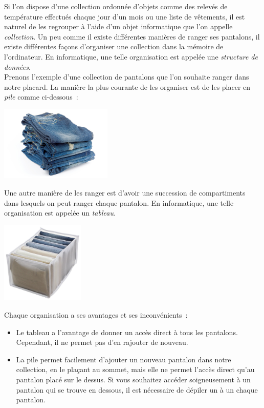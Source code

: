 \documentclass{magnolia}
\begin{document}

\magtoc

\bigskip

Si l'on dispose d'une collection ordonnée d'objets comme des relevés de température effectués
chaque jour d'un mois ou une liste de vêtements, il est naturel de les regrouper à l'aide d'un objet
informatique que l'on appelle \emph{collection}. Un peu comme il existe différentes manières de
ranger ses pantalons, il existe différentes façons d'organiser une collection dans
la mémoire de l'ordinateur. En informatique, une telle organisation est appelée une
\emph{structure de données}.\\

Prenons l'exemple d'une collection de pantalons que l'on souhaite ranger dans notre placard. La manière
la plus courante de les organiser est de les placer en \emph{pile} comme ci-dessous~:
\begin{center}
\includegraphics[width=0.4\textwidth]{../../Commun/Images/python-cours-jeans-pile}
\end{center}
Une autre manière de les ranger est d'avoir une succession de compartiments
dans lesquels on peut ranger chaque pantalon. En informatique, une telle organisation est appelée
un \emph{tableau}.
\begin{center}
\includegraphics[width=0.3\textwidth]{../../Commun/Images/python-cours-jeans-tableau}
\end{center}
Chaque organisation a ses avantages et ses inconvénients~:
\begin{itemize}
\item Le tableau a l'avantage de donner un accès direct à tous les pantalons. Cependant, il ne permet
  pas d'en rajouter de nouveau.
\item La pile permet facilement d'ajouter un nouveau pantalon dans notre collection, en
  le plaçant au sommet, mais elle ne permet l'accès direct qu'au pantalon placé sur le dessus.
  Si vous souhaitez accéder soigneusement à un pantalon qui se trouve en dessous, il est
  nécessaire de dépiler un à un chaque pantalon.
\end{itemize}
\end{document}

